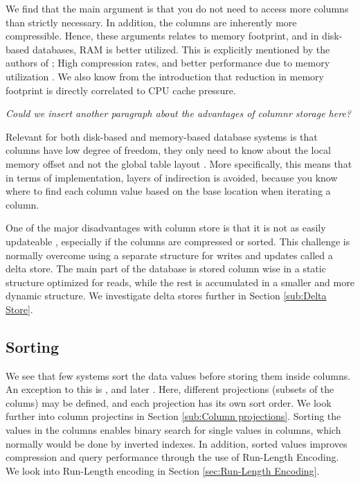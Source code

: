 We find that the main argument is that you do not need to access more columns than strictly necessary. In addition, the columns are inherently more compressible. Hence, these arguments relates to memory footprint, and in disk-based databases, RAM is better utilized. This is explicitly mentioned by the authors of \mssql; High compression rates, and better performance due to memory utilization \cite{noauthor_undated-vq}. We also know from the introduction that reduction in memory footprint is directly correlated to CPU cache pressure. 

\textit{Could we insert another paragraph about the advantages of columnr storage here?}

Relevant for both disk-based and memory-based database systems is that columns have low degree of freedom, they only need to know about the local memory offset and not the global table layout \cite{Boncz2005-wj}. More specifically, this means that in terms of implementation, layers of indirection is avoided, because you know where to find each column value based on the base location when iterating a column. 

One of the major disadvantages with column store is that it is not as easily updateable \cite{Bjorklund2011-wh}, especially if the columns are compressed or sorted. This challenge is normally overcome using a separate structure for writes and updates called a delta store. The main part of the database is stored column wise in a static structure optimized for reads, while the rest is accumulated in a smaller and more dynamic structure. We investigate delta stores further in Section \ref{sub:Delta Store}.


\subsection{Sorting}
\label{sub:Sorting}
We see that few systems sort the data values before storing them inside columns. An exception to this is \cstore, and later \vertica \cite{Stonebraker2005-qz, Lamb2012-kg}. Here, different projections (subsets of the colums) may be defined, and each projection has its own sort order. We look further into column projectins in Section \ref{sub:Column projections}. Sorting the values in the columns enables binary search for single values in columns, which normally would be done by inverted indexes. In addition, sorted values improves compression and query performance through the use of Run-Length Encoding. We look into Run-Length encoding in Section \ref{sec:Run-Length Encoding}.

